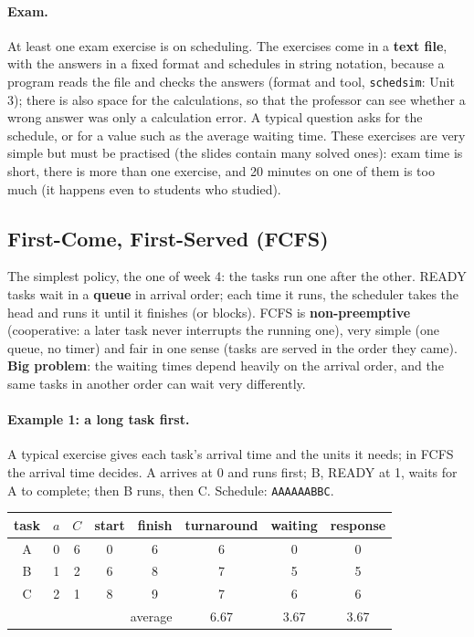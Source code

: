 \paragraph{Exam.} At least one exam exercise is on scheduling. The exercises come in a \textbf{text file}, with the answers in a fixed format and schedules in string notation, because a program reads the file and checks the answers (format and tool, \texttt{schedsim}: Unit 3); there is also space for the calculations, so that the professor can see whether a wrong answer was only a calculation error. A typical question asks for the schedule, or for a value such as the average waiting time. These exercises are very simple but must be practised (the slides contain many solved ones): exam time is short, there is more than one exercise, and 20 minutes on one of them is too much (it happens even to students who studied).

\subsection{First-Come, First-Served (FCFS)}
The simplest policy, the one of week 4: the tasks run one after the other. READY tasks wait in a \textbf{queue} in arrival order; each time it runs, the scheduler takes the head and runs it until it finishes (or blocks). FCFS is \textbf{non-preemptive} (cooperative: a later task never interrupts the running one), very simple (one queue, no timer) and fair in one sense (tasks are served in the order they came). \textbf{Big problem}: the waiting times depend heavily on the arrival order, and the same tasks in another order can wait very differently.

\paragraph{Example 1: a long task first.} A typical exercise gives each task's arrival time and the units it needs; in FCFS the arrival time decides. A arrives at 0 and runs first; B, READY at 1, waits for A to complete; then B runs, then C. Schedule: \texttt{AAAAAABBC}.

\begin{center}
    \begin{tabular}{c c c | c c c c c}
        \hline
        task & $a$ & $C$ & start & finish & turnaround & waiting & response \\
        \hline
        A & 0 & 6 & 0 & 6 & 6 & 0 & 0 \\
        B & 1 & 2 & 6 & 8 & 7 & 5 & 5 \\
        C & 2 & 1 & 8 & 9 & 7 & 6 & 6 \\
        \hline
        \multicolumn{5}{r}{average} & 6.67 & 3.67 & 3.67 \\
    \end{tabular}
\end{center}

